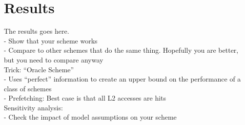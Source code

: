 \section{Results}
The results goes here.
\\
- Show that your scheme works\\
- Compare to other schemes that do the same thing. Hopefully you are better, but you need to compare anyway\\
Trick: “Oracle Scheme”\\
- Uses “perfect” information to create an upper bound on the 
performance of a class of schemes\\
- Prefetching: Best case is that all L2 accesses are hits\\
Sensitivity analysis: \\
- Check the impact of model assumptions on your
scheme